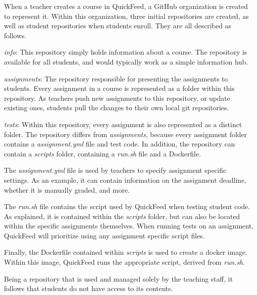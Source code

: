 When a teacher creates a course in QuickFeed, a GitHub organization is created to represent it.
Within this organization, three initial repositories are created, as well as student repositories when students enroll.
They are all described as follows.

\textit{info}: This repository simply holds information about a course.
The repository is available for all students, and would typically work as a simple information hub.

\textit{assignments}: The repository responsible for presenting the assignments to students.
Every assignment in a course is represented as a folder within this repository.
As teachers push new assignments to this repository, or update existing ones, students pull the changes to their own local git repositories.

\textit{tests}: Within this repository, every assignment is also represented as a distinct folder.
The repository differs from \textit{assignments}, because every assignment folder contains a \textit{assignment.yml} file and test code.
In addition, the repository can contain a \textit{scripts} folder, containing a \textit{run.sh} file and a Dockerfile.

The \textit{assignment.yml} file is used by teachers to specify assignment specific settings.
As an example, it can contain information on the assignment deadline, whether it is manually graded, and more.

The \textit{run.sh} file contains the script used by QuickFeed when testing student code.
As explained, it is contained within the \textit{scripts} folder, but can also be located within the specific assignments themselves.
When running tests on an assignment, QuickFeed will prioritize using any assignment specific script files.

Finally, the Dockerfile contained within \textit{scripts} is used to create a docker image.
Within this image, QuickFeed runs the appropriate script, derived from \textit{run.sh}.

Being a repository that is used and managed solely by the teaching staff, it follows that students do not have access to its contents.

